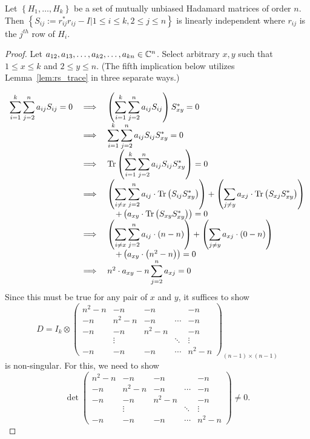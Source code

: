 \begin{lemma} \label{lem:muhm_lin_indep}
 Let $\left\{H_1,\dots,H_k\right\}$ be a set of mutually unbiased Hadamard matrices of order $n$. Then $\left\{S_{ij} := r_{ij}^*r_{ij} - I | 1 \leq i \leq k,2 \leq j \leq n\right\}$ is linearly independent where $r_{ij}$ is the $j^{th}$ row of $H_{i}$.
 \begin{proof}
  Let $a_{12},a_{13},\dots,a_{k2},\dots,a_{kn} \in \mathbb{C}^n$. Select arbitrary $x,y$ such that $1 \leq x \leq k$ and $2 \leq y \leq n$. (The fifth implication below utilizes Lemma~\ref{lem:rs_trace} in three separate ways.)

  $$\begin{array}{rcl}
     \displaystyle\sum_{i=1}^{k}\sum_{j=2}^n a_{ij}S_{ij} = 0
          &\implies& \left(\displaystyle\sum_{i=1}^{k}\sum_{j=2}^n a_{ij}S_{ij}\right)S_{xy}^* = 0\\
          &\implies& \displaystyle\sum_{i=1}^{k}\sum_{j=2}^n a_{ij}S_{ij}S_{xy}^* = 0\\
          &\implies& \text{Tr}\left(\displaystyle\sum_{i=1}^{k}\sum_{j=2}^n a_{ij}S_{ij}S_{xy}^*\right) = 0\\
          &\implies& \left(\displaystyle\sum_{i \neq x}\sum_{j=2}^n a_{ij}\cdot\text{Tr}\left(S_{ij}S_{xy}^*\right)\right) + \left(\displaystyle\sum_{j \neq y}  a_{xj}\cdot\text{Tr}\left(S_{xj}S_{xy}^*\right)\right) \\ &&~~~+ \left(a_{xy}\cdot\text{Tr}\left(S_{xy}S_{xy}^*\right)\right) = 0 \\
          &\implies& \left(\displaystyle\sum_{i \neq x}\sum_{j=2}^n a_{ij}\cdot\left(n-n\right)\right) + \left(\displaystyle\sum_{j \neq y}  a_{xj}\cdot\left(0-n\right)\right) \\&&~~~+ \left(a_{xy}\cdot\left(n^2-n\right)\right) = 0 \\
          &\implies& n^2 \cdot a_{xy} - n\displaystyle\sum_{j=2}^n a_{xj} = 0
    \end{array}
  $$
Since this must be true for any pair of $x$ and $y$, it suffices to show
  $$D = I_{k} \otimes \left(\begin{array}{cccccc}
     n^2 - n & -n & -n &        & -n \\
     -n & n^2 - n & -n & \cdots & -n \\
     -n & -n & n^2 - n &        & -n \\
         & \vdots      & & \ddots & \vdots \\
     -n & -n & -n & \cdots & n^2 - n
   \end{array}\right)_{(n-1) \times (n-1)}$$
is non-singular. For this, we need to show
  $$\det\left(\begin{array}{cccccc}
     n^2 - n & -n & -n &        & -n \\
     -n & n^2 - n & -n & \cdots & -n \\
     -n & -n & n^2 - n &        & -n \\
      &  \vdots      & & \ddots & \vdots \\
     -n & -n & -n & \cdots & n^2 - n
   \end{array}\right) \neq 0.$$


\end{proof}
\end{lemma}

